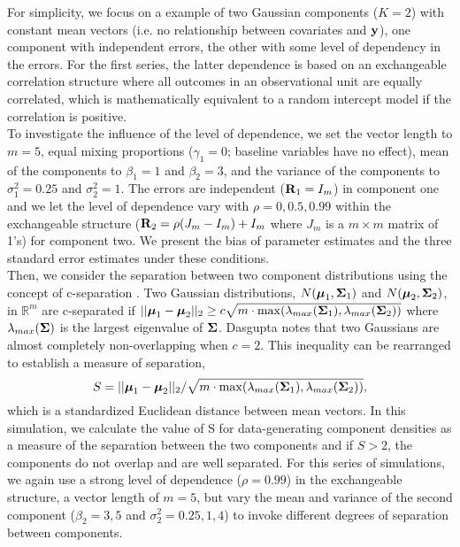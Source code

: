  For simplicity, we focus on a example of two Gaussian components ($K = 2$) with constant mean vectors (i.e. no relationship between covariates and $\mathbf y$), one component with independent errors, the other with some level of dependency in the errors. For the first series, the latter dependence is based on an exchangeable correlation structure where all outcomes in an observational unit are equally correlated, which is mathematically equivalent to a random intercept model if the correlation is positive.\\
 
To investigate the influence of the level of dependence, we set the vector length to $m=5$, equal mixing proportions ($\gamma_{1}=0$; baseline variables have no effect), mean of the components to $\beta_{1}=1$ and $\beta_{2}=3$, and the variance of the components to $\sigma^{2}_{1}=0.25$ and $\sigma^{2}_{2}=1$. The errors are independent ($\mathbf R_{1}=I_{m}$) in component one and we let the level of dependence vary with $\rho=0,0.5,0.99$ within the exchangeable structure ($\mathbf R_2 = \rho(J_m-I_m)+I_m$ where $J_m$ is a $m\times m$ matrix of 1's) for component two. We present the bias of parameter estimates and the three standard error estimates under these conditions.\\

Then, we consider the separation between two component distributions using the concept of c-separation \cite{dasgupta1999}. Two Gaussian distributions, $N(\boldsymbol\mu_{1},\boldsymbol\Sigma_{1})$ and $N(\boldsymbol\mu_{2},\boldsymbol\Sigma_{2})$, in $\mathbb{R}^{m}$ are c-separated if $||\boldsymbol\mu_{1}-\boldsymbol\mu_{2}||_{2}\geq c\sqrt{m\cdot\max(\lambda_{max}(\boldsymbol\Sigma_{1}),\lambda_{max}(\boldsymbol\Sigma_{2}))}$
where $\lambda_{max}(\boldsymbol\Sigma)$ is the largest eigenvalue of $\boldsymbol\Sigma$.  Dasgupta \cite{dasgupta1999} notes that two Gaussians are almost completely non-overlapping when $c=2$. This inequality can be rearranged to establish a measure of separation,
$$S = ||\boldsymbol\mu_{1}-\boldsymbol\mu_{2}||_{2}/\sqrt{m\cdot\max(\lambda_{max}(\boldsymbol\Sigma_{1}),\lambda_{max}(\boldsymbol\Sigma_{2}))},$$
which is a standardized Euclidean distance between mean vectors. In this simulation, we calculate the value of S for data-generating component densities as a measure of the separation between the two components and if $S>2$, the components do not overlap and are well separated. For this series of simulations, we again use a strong level of dependence ($\rho=0.99$) in the exchangeable structure, a vector length of $m=5$, but vary the mean and variance of the second component ($\beta_{2}=3,5$ and $\sigma_{2}^{2}=0.25,1,4$) to invoke different degrees of separation between components.\\

